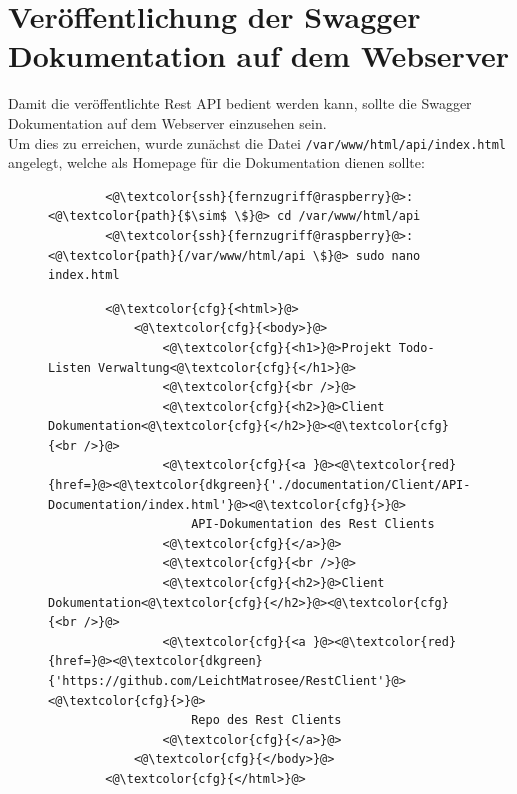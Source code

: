 \documentclass[a4paper, 11pt]{scrartcl}
\begin{document}
\section{Veröffentlichung der Swagger Dokumentation auf dem Webserver}
Damit die veröffentlichte Rest API bedient werden kann, sollte die Swagger Dokumentation auf dem Webserver einzusehen sein.
\\
Um dies zu erreichen, wurde zunächst die Datei \lstinline[basicstyle={\small\ttfamily\color{black}}]|/var/www/html/api/index.html| angelegt, welche als Homepage für die Dokumentation
dienen sollte:
\begin{figure}[H]
    \begin{mdframed}[backgroundcolor=bbg]
        \begin{lstlisting}
        <@\textcolor{ssh}{fernzugriff@raspberry}@>:<@\textcolor{path}{$\sim$ \$}@> cd /var/www/html/api
        <@\textcolor{ssh}{fernzugriff@raspberry}@>:<@\textcolor{path}{/var/www/html/api \$}@> sudo nano index.html
        \end{lstlisting}
    \end{mdframed}
    \label{lst:doc_nano}
\end{figure}
\begin{figure}[H]
    \begin{mdframed}[backgroundcolor=bbg]
        \begin{lstlisting}
        <@\textcolor{cfg}{<html>}@>
            <@\textcolor{cfg}{<body>}@>
                <@\textcolor{cfg}{<h1>}@>Projekt Todo-Listen Verwaltung<@\textcolor{cfg}{</h1>}@>
                <@\textcolor{cfg}{<br />}@>
                <@\textcolor{cfg}{<h2>}@>Client Dokumentation<@\textcolor{cfg}{</h2>}@><@\textcolor{cfg}{<br />}@>
                <@\textcolor{cfg}{<a }@><@\textcolor{red}{href=}@><@\textcolor{dkgreen}{'./documentation/Client/API-Documentation/index.html'}@><@\textcolor{cfg}{>}@>
                    API-Dokumentation des Rest Clients
                <@\textcolor{cfg}{</a>}@>
                <@\textcolor{cfg}{<br />}@>
                <@\textcolor{cfg}{<h2>}@>Client Dokumentation<@\textcolor{cfg}{</h2>}@><@\textcolor{cfg}{<br />}@>
                <@\textcolor{cfg}{<a }@><@\textcolor{red}{href=}@><@\textcolor{dkgreen}{'https://github.com/LeichtMatrosee/RestClient'}@><@\textcolor{cfg}{>}@>
                    Repo des Rest Clients
                <@\textcolor{cfg}{</a>}@>
            <@\textcolor{cfg}{</body>}@>
        <@\textcolor{cfg}{</html>}@>
        \end{lstlisting}
    \end{mdframed}
    \label{lst:index_apache2}
\end{figure}
\end{document}
